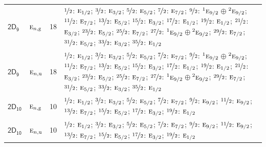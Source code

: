 \documentclass[10pt,a4paper]{article}
\numberwithin{equation}{section}
\newcommand{\grp}[1]{\mathsf{#1}}
\newcommand{\irr}[1]{\text{\normalfont\scshape #1}}
\newcommand{\conjpair}[1]{{}^{#1}}
\newcommand{\ptag}[1]{\mathrm{#1}}
\newlength{\fillwidth}\newlength{\cellwidth}\newlength{\colwidth}
\begin{document}
{\begin{longtable}{@{}llr>{\RaggedRight\arraybackslash}p{\fillwidth}@{}}
\href{2D9.pdf}{$\grp{2D_{9}}$} & $\irr{e}_{n,\ptag{g}}$ & 18 & $\nicefrac{1}{2}$: $\irr{e}_{1/2}$; $\nicefrac{3}{2}$: $\irr{e}_{3/2}$; $\nicefrac{5}{2}$: $\irr{e}_{5/2}$; $\nicefrac{7}{2}$: $\irr{e}_{7/2}$; $\nicefrac{9}{2}$: $\conjpair{1}\irr{e}_{9/2}$${}\oplus{}$$\conjpair{2}\irr{e}_{9/2}$; $\nicefrac{11}{2}$: $\irr{e}_{7/2}$; $\nicefrac{13}{2}$: $\irr{e}_{5/2}$; $\nicefrac{15}{2}$: $\irr{e}_{3/2}$; $\nicefrac{17}{2}$: $\irr{e}_{1/2}$; $\nicefrac{19}{2}$: $\irr{e}_{1/2}$; $\nicefrac{21}{2}$: $\irr{e}_{3/2}$; $\nicefrac{23}{2}$: $\irr{e}_{5/2}$; $\nicefrac{25}{2}$: $\irr{e}_{7/2}$; $\nicefrac{27}{2}$: $\conjpair{1}\irr{e}_{9/2}$${}\oplus{}$$\conjpair{2}\irr{e}_{9/2}$; $\nicefrac{29}{2}$: $\irr{e}_{7/2}$; $\nicefrac{31}{2}$: $\irr{e}_{5/2}$; $\nicefrac{33}{2}$: $\irr{e}_{3/2}$; $\nicefrac{35}{2}$: $\irr{e}_{1/2}$\\
\href{2D9.pdf}{$\grp{2D_{9}}$} & $\irr{e}_{n,\ptag{u}}$ & 18 & $\nicefrac{1}{2}$: $\irr{e}_{1/2}$; $\nicefrac{3}{2}$: $\irr{e}_{3/2}$; $\nicefrac{5}{2}$: $\irr{e}_{5/2}$; $\nicefrac{7}{2}$: $\irr{e}_{7/2}$; $\nicefrac{9}{2}$: $\conjpair{1}\irr{e}_{9/2}$${}\oplus{}$$\conjpair{2}\irr{e}_{9/2}$; $\nicefrac{11}{2}$: $\irr{e}_{7/2}$; $\nicefrac{13}{2}$: $\irr{e}_{5/2}$; $\nicefrac{15}{2}$: $\irr{e}_{3/2}$; $\nicefrac{17}{2}$: $\irr{e}_{1/2}$; $\nicefrac{19}{2}$: $\irr{e}_{1/2}$; $\nicefrac{21}{2}$: $\irr{e}_{3/2}$; $\nicefrac{23}{2}$: $\irr{e}_{5/2}$; $\nicefrac{25}{2}$: $\irr{e}_{7/2}$; $\nicefrac{27}{2}$: $\conjpair{1}\irr{e}_{9/2}$${}\oplus{}$$\conjpair{2}\irr{e}_{9/2}$; $\nicefrac{29}{2}$: $\irr{e}_{7/2}$; $\nicefrac{31}{2}$: $\irr{e}_{5/2}$; $\nicefrac{33}{2}$: $\irr{e}_{3/2}$; $\nicefrac{35}{2}$: $\irr{e}_{1/2}$\\
\href{2D10.pdf}{$\grp{2D_{10}}$} & $\irr{e}_{n,\ptag{g}}$ & 10 & $\nicefrac{1}{2}$: $\irr{e}_{1/2}$; $\nicefrac{3}{2}$: $\irr{e}_{3/2}$; $\nicefrac{5}{2}$: $\irr{e}_{5/2}$; $\nicefrac{7}{2}$: $\irr{e}_{7/2}$; $\nicefrac{9}{2}$: $\irr{e}_{9/2}$; $\nicefrac{11}{2}$: $\irr{e}_{9/2}$; $\nicefrac{13}{2}$: $\irr{e}_{7/2}$; $\nicefrac{15}{2}$: $\irr{e}_{5/2}$; $\nicefrac{17}{2}$: $\irr{e}_{3/2}$; $\nicefrac{19}{2}$: $\irr{e}_{1/2}$\\
\href{2D10.pdf}{$\grp{2D_{10}}$} & $\irr{e}_{n,\ptag{u}}$ & 10 & $\nicefrac{1}{2}$: $\irr{e}_{1/2}$; $\nicefrac{3}{2}$: $\irr{e}_{3/2}$; $\nicefrac{5}{2}$: $\irr{e}_{5/2}$; $\nicefrac{7}{2}$: $\irr{e}_{7/2}$; $\nicefrac{9}{2}$: $\irr{e}_{9/2}$; $\nicefrac{11}{2}$: $\irr{e}_{9/2}$; $\nicefrac{13}{2}$: $\irr{e}_{7/2}$; $\nicefrac{15}{2}$: $\irr{e}_{5/2}$; $\nicefrac{17}{2}$: $\irr{e}_{3/2}$; $\nicefrac{19}{2}$: $\irr{e}_{1/2}$\\

\end{longtable}}
\end{document}
